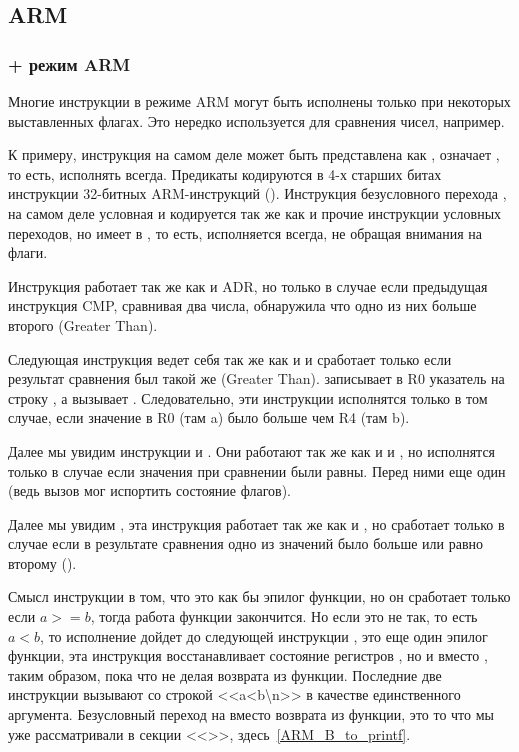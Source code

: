 ﻿%
\subsection{ARM}

\subsubsection{\OptimizingKeil + режим ARM}



Многие инструкции в режиме ARM могут быть исполнены только при некоторых выставленных флагах.
Это нередко используется для сравнения чисел, например.

К примеру, инструкция  на самом деле может быть представлена как ,  означает 
, то есть, исполнять всегда. Предикаты кодируются в 4-х старших битах инструкции 32-битных ARM-инструкций
().
Инструкция безусловного перехода , на самом деле условная и кодируется так же как и прочие инструкции условных
переходов, но имеет  в , то есть, исполняется всегда, не обращая внимания на флаги.

Инструкция  работает так же как и ADR, но только в случае если предыдущая инструкция CMP,
сравнивая два числа, обнаружила что одно из них больше второго (Greater Than).

Следующая инструкция  ведет себя так же как и  и сработает только если 
результат сравнения был такой же (Greater Than).  записывает в R0 указатель на строку 
,
а  вызывает \printf. Следовательно, эти инструкции исполнятся только в том случае, если значение
в R0 (там a) было больше чем R4 (там b). 

Далее мы увидим инструкции  и . Они работают так же как и  и , 
но исполнятся только в случае если
значения при сравнении были равны. Перед ними еще один \CMP (ведь вызов \printf мог испортить состояние флагов).

Далее мы увидим , эта инструкция работает так же как и , но сработает только в случае если 
в результате сравнения одно из значений было больше или равно второму ().

Смысл инструкции  в том, что это как бы эпилог функции, но он сработает только
если $a>=b$, тогда работа функции закончится. 
Но если это не так, то есть $a<b$, то исполнение дойдет до следующей инструкции 
, это еще один эпилог функции, эта инструкция восстанавливает состояние регистров
, но и \LR вместо \PC, таким образом, пока что не делая возврата из функции. 
Последние две инструкции вызывают
\printf со строкой <<a<b\textbackslash{}n>> в качестве единственного аргумента. Безусловный переход на \printf вместо возврата
из функции, это то что мы уже рассматривали в секции <<\PrintfSeveralArgumentsSectionName>>, 
здесь~\ref{ARM_B_to_printf}.

